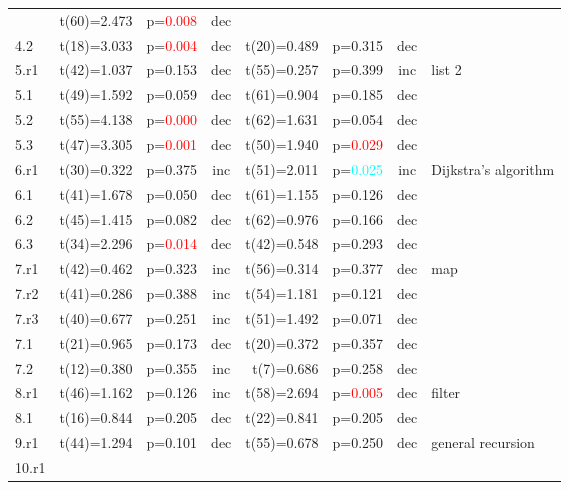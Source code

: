 \begin{table}
\begin{center}
\begin{tabular}{|l||c|c|c||c|c|c||l|}
    & t(60)=2.473 & p=\textcolor{red}{0.008} & dec
    & \\ \cline{1-7}
    4.2
    & t(18)=3.033 & p=\textcolor{red}{0.004} & dec
    & t(20)=0.489 & p=0.315 & dec
    & \\ \hline
    5.r1
    & t(42)=1.037 & p=0.153 & dec
    & t(55)=0.257 & p=0.399 & inc
    & list 2\\ \cline{1-7}
    5.1
    & t(49)=1.592 & p=0.059 & dec
    & t(61)=0.904 & p=0.185 & dec
    & \\ \cline{1-7}
    5.2
    & t(55)=4.138 & p=\textcolor{red}{0.000} & dec
    & t(62)=1.631 & p=0.054 & dec
    & \\ \cline{1-7}
    5.3
    & t(47)=3.305 & p=\textcolor{red}{0.001} & dec
    & t(50)=1.940 & p=\textcolor{red}{0.029} & dec
    & \\ \hline
    6.r1
    & t(30)=0.322 & p=0.375 & inc
    & t(51)=2.011 & p=\textcolor{cyan}{0.025} & inc
    & Dijkstra's algorithm\\ \cline{1-7}
    6.1
    & t(41)=1.678 & p=0.050 & dec
    & t(61)=1.155 & p=0.126 & dec
    & \\ \cline{1-7}
    6.2
    & t(45)=1.415 & p=0.082 & dec
    & t(62)=0.976 & p=0.166 & dec
    & \\ \cline{1-7}
    6.3
    & t(34)=2.296 & p=\textcolor{red}{0.014} & dec
    & t(42)=0.548 & p=0.293 & dec
    & \\ \hline
    7.r1
    & t(42)=0.462 & p=0.323 & inc
    & t(56)=0.314 & p=0.377 & dec
    & map\\ \cline{1-7}
    7.r2
    & t(41)=0.286 & p=0.388 & inc
    & t(54)=1.181 & p=0.121 & dec
    & \\ \cline{1-7}
    7.r3
    & t(40)=0.677 & p=0.251 & inc
    & t(51)=1.492 & p=0.071 & dec
    & \\ \cline{1-7}
    7.1
    & t(21)=0.965 & p=0.173 & dec
    & t(20)=0.372 & p=0.357 & dec
    & \\ \cline{1-7}
    7.2
    & t(12)=0.380 & p=0.355 & inc
    & \, t(7)=0.686 & p=0.258 & dec
    & \\ \hline
    8.r1
    & t(46)=1.162 & p=0.126 & inc
    & t(58)=2.694 & p=\textcolor{red}{0.005} & dec
    & filter\\ \cline{1-7}
    8.1
    & t(16)=0.844 & p=0.205 & dec
    & t(22)=0.841 & p=0.205 & dec
    & \\ \hline
    9.r1
    & t(44)=1.294 & p=0.101 & dec
    & t(55)=0.678 & p=0.250 & dec
    & general recursion\\ \hline
    10.r1

\end{tabular}
\end{center}
\end{table}
